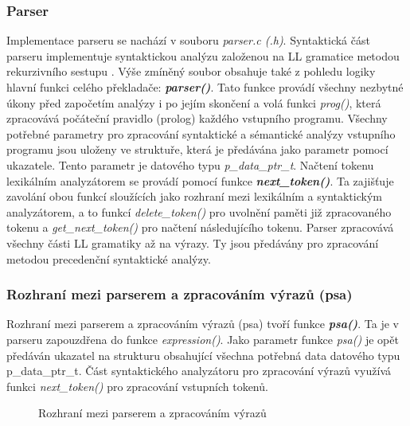 \documentclass[a4paper, 12pt]{article}
\begin{document}
\subsubsection{Parser}
Implementace parseru se nachází v souboru \textit{parser.c (.h)}. Syntaktická část parseru implementuje syntaktickou analýzu založenou na LL gramatice metodou rekurzivního sestupu \cite{FITPUB8538}. Výše zmíněný soubor obsahuje také z pohledu logiky hlavní funkci celého překladače: \textit{\textbf{parser()}}. Tato funkce provádí všechny nezbytné úkony před započetím analýzy i po jejím skončení a volá funkci \textit{prog()}, která zpracovává počáteční pravidlo (prolog) každého vstupního programu. Všechny potřebné parametry pro zpracování syntaktické a sémantické analýzy vstupního programu jsou uloženy ve struktuře, která je předávána jako parametr pomocí ukazatele. Tento parametr je datového typu \textit{p\_data\_ptr\_t}. Načtení tokenu lexikálním analyzátorem se provádí pomocí funkce \textit{\textbf{next\_token()}}. Ta zajišťuje zavolání obou funkcí sloužících jako rozhraní mezi lexikálním a syntaktickým analyzátorem, a to funkcí \textit{delete\_token()} pro uvolnění paměti již zpracovaného tokenu a \textit{get\_next\_token()} pro načtení následujícího tokenu. Parser zpracovává všechny části LL gramatiky až na výrazy. Ty jsou předávány pro zpracování metodou precedenční syntaktické analýzy.

\subsubsection{Rozhraní mezi parserem a zpracováním výrazů (psa)}
Rozhraní mezi parserem a zpracováním výrazů (psa) tvoří funkce \textit{\textbf{psa()}}. Ta je v parseru zapouzdřena do funkce \textit{expression()}. Jako parametr funkce \textit{psa()} je opět předáván ukazatel na strukturu obsahující všechna potřebná data datového typu p\_data\_ptr\_t. Část syntaktického analyzátoru pro zpracování výrazů využívá funkci \textit{next\_token()} pro zpracování vstupních tokenů.

\vspace{4cm}

\begin{figure}[ht!]
\begin{center}
\caption{Rozhraní mezi parserem a zpracováním výrazů}
\end{center}
\end{figure}
\end{document}
